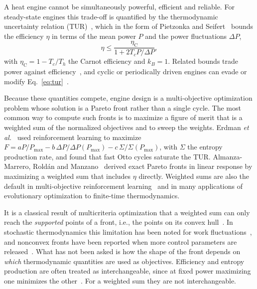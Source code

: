 \documentclass[pre,twocolumn,superscriptaddress,nofootinbib,longbibliography]{revtex4-2}
\newcommand{\etaC}{\eta_{\mathrm{C}}}
\newcommand{\Pmax}{P_{\max}}
\begin{document}
A heat engine cannot be simultaneously powerful, efficient and reliable. For steady-state engines
this trade-off is quantified by the thermodynamic uncertainty relation
(TUR)~\cite{Barato2015,Gingrich2016}, which in the form of Pietzonka and
Seifert~\cite{Pietzonka2018} bounds the efficiency $\eta$ in terms of the mean power $P$ and the
power fluctuations $\Delta P$,
\begin{equation}
\eta \le \frac{\etaC}{1 + 2T_c P/\Delta P},
\label{eq:tur}
\end{equation}
with $\etaC = 1 - T_c/T_h$ the Carnot efficiency and $k_B = 1$. Related bounds trade power against
efficiency~\cite{Shiraishi2016}, and cyclic or periodically driven engines can evade or modify
Eq.~\eqref{eq:tur}~\cite{Holubec2018,Koyuk2019,Miller2021,Gramajo2023}.

Because these quantities compete, engine design is a multi-objective optimization problem whose
solution is a Pareto front rather than a single cycle. The most common way to compute such fronts
is to maximize a figure of merit that is a weighted sum of the normalized objectives and to sweep
the weights. Erdman \emph{et al.}~\cite{Erdman2023} used reinforcement learning to maximize
$F = aP/\Pmax - b\,\Delta P/\Delta P(\Pmax) - c\,\Sigma/\Sigma(\Pmax)$, with $\Sigma$ the entropy
production rate, and found that fast Otto cycles saturate the TUR. Almanza-Marrero, Rold\'an and
Manzano~\cite{Almanza2026} derived exact Pareto fronts in linear response by maximizing a weighted
sum that includes $\eta$ directly. Weighted sums are also the default in multi-objective
reinforcement learning~\cite{VanMoffaert2013} and in many applications of evolutionary
optimization to finite-time thermodynamics.

It is a classical result of multicriteria optimization that a weighted sum can only reach the
\emph{supported} points of a front, i.e., the points on its convex hull~\cite{DasDennis1997,Ehrgott2005}.
In stochastic thermodynamics this limitation has been noted for work fluctuations~\cite{Solon2018},
and nonconvex fronts have been reported when more control parameters are
released~\cite{Forao2025}. What has not been asked is how the shape of the front depends on
\emph{which} thermodynamic quantities are used as objectives. Efficiency and entropy production
are often treated as interchangeable, since at fixed power maximizing one minimizes the
other~\cite{Erdman2023}. For a weighted sum they are not interchangeable.
\end{document}
